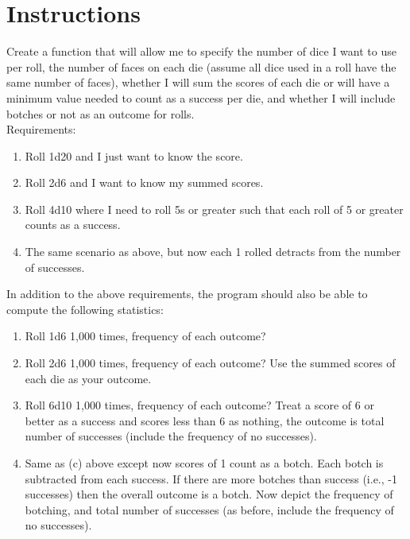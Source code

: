 \documentclass[twocolumn,letterpaper]{article}  %
\begin{document}
\section{Instructions}
Create a function that will allow me to specify the number of dice I want to use per roll, the number of faces on each die (assume all dice used in a roll have the same number of faces), whether I will sum the scores of each die or will have a minimum value needed to count as a success per die, and whether I will include botches or not as an outcome for rolls.\\

\noindent Requirements:%
\begin{enumerate}
\itemsep-.25em
\item Roll 1d20 and I just want to know the score.
\item Roll 2d6 and I want to know my summed scores.
\item Roll 4d10 where I need to roll 5s or greater such that each roll of 5 or greater counts as a success.
\item The same scenario as above, but now each 1 rolled detracts from the number of successes.
\end{enumerate}

In addition to the above requirements, the program should also be able to compute the following statistics:%
\begin{enumerate}
\itemsep-.25em
\item Roll 1d6 1,000 times, frequency of each outcome?
\item Roll 2d6 1,000 times, frequency of each outcome? Use the summed scores of each die as your outcome.
\item Roll 6d10 1,000 times, frequency of each outcome? Treat a score of 6 or better as a success and scores less than 6 as nothing, the outcome is total number of successes (include the frequency of no successes).
\item Same as (c) above except now scores of 1 count as a botch. Each botch is subtracted from each success. If there are more botches than success (i.e., -1 successes) then the overall outcome is a botch. Now depict the frequency of botching, and total number of successes (as before, include the frequency of no successes).

\end{enumerate}



\end{document}
